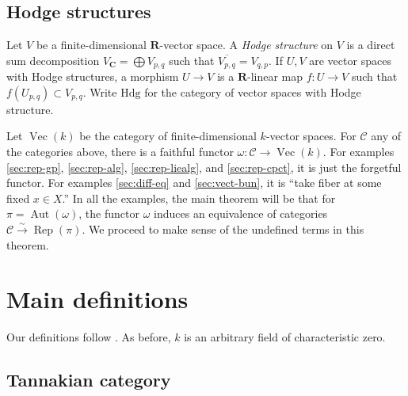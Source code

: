 \documentclass{article}
\DeclareMathOperator{\aut}{Aut}
\DeclareMathOperator{\rep}{Rep}
\DeclareMathOperator{\vect}{Vec}
\newcommand{\cC}{\mathcal{C}}
\newcommand{\dC}{\mathbf{C}}
\newcommand{\dR}{\mathbf{R}}
\newcommand{\hodge}{\mathrm{Hdg}}
\newcommand{\iso}{\xrightarrow\sim}
\begin{document}
\subsection{Hodge structures}

Let $V$ be a finite-dimensional $\dR$-vector space. A \emph{Hodge structure} 
on $V$ is a direct sum decomposition $V_\dC=\bigoplus V_{p,q}$ such that 
$\overline{V_{p,q}}=V_{q,p}$. If $U,V$ are vector spaces with Hodge structures, 
a morphism $U\to V$ is a $\dR$-linear map $f:U\to V$ such that 
$f(U_{p,q})\subset V_{p,q}$. Write $\hodge$ for the category of vector spaces 
with Hodge structure. 

Let $\vect(k)$ be the category of finite-dimensional $k$-vector spaces. For 
$\cC$ any of the categories above, there is a faithful functor 
$\omega:\cC\to \vect(k)$. For examples \ref{sec:rep-gp}, \ref{sec:rep-alg}, 
\ref{sec:rep-liealg}, and \ref{sec:rep-cpct}, it is just the forgetful functor. 
For examples \ref{sec:diff-eq} and \ref{sec:vect-bun}, it is ``take fiber at 
some fixed $x\in X$.'' In all the examples, the main theorem will be that for 
$\pi=\aut(\omega)$, the functor $\omega$ induces an equivalence of categories 
$\cC\iso \rep(\pi)$. We proceed to make sense of the undefined terms in this 
theorem. 





\section{Main definitions}

Our definitions follow \cite{deligne-milne-1982}. As before, $k$ is an 
arbitrary field of characteristic zero. 


\subsection{Tannakian category}
\end{document}
